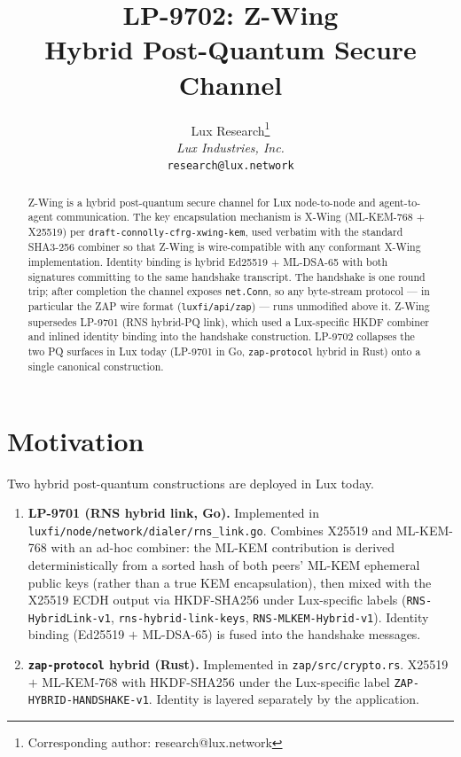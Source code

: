 \documentclass[11pt,a4paper]{article}
\title{LP-9702: Z-Wing\\Hybrid Post-Quantum Secure Channel}
\author{
Lux Research\thanks{Corresponding author: research@lux.network}\\
\textit{Lux Industries, Inc.}\\
\texttt{research@lux.network}
}
\date{}
\begin{document}
\luxcoverpage

\begin{abstract}
Z-Wing is a hybrid post-quantum secure channel for Lux node-to-node and
agent-to-agent communication. The key encapsulation mechanism is X-Wing
(ML-KEM-768 $+$ X25519) per \texttt{draft-connolly-cfrg-xwing-kem}, used
verbatim with the standard SHA3-256 combiner so that Z-Wing is wire-compatible
with any conformant X-Wing implementation. Identity binding is hybrid
Ed25519 $+$ ML-DSA-65 with both signatures committing to the same handshake
transcript. The handshake is one round trip; after completion the channel
exposes \texttt{net.Conn}, so any byte-stream protocol --- in particular the
ZAP wire format (\texttt{luxfi/api/zap}) --- runs unmodified above it.
Z-Wing supersedes LP-9701 (RNS hybrid-PQ link), which used a Lux-specific
HKDF combiner and inlined identity binding into the handshake construction.
LP-9702 collapses the two PQ surfaces in Lux today (LP-9701 in Go,
\texttt{zap-protocol} hybrid in Rust) onto a single canonical construction.
\end{abstract}

\tableofcontents
\newpage

\section{Motivation}

Two hybrid post-quantum constructions are deployed in Lux today.

\begin{enumerate}[leftmargin=*]
  \item \textbf{LP-9701 (RNS hybrid link, Go).} Implemented in
        \texttt{luxfi/node/network/dialer/rns\_link.go}. Combines X25519
        and ML-KEM-768 with an ad-hoc combiner: the ML-KEM contribution
        is derived deterministically from a sorted hash of both peers'
        ML-KEM ephemeral public keys (rather than a true KEM
        encapsulation), then mixed with the X25519 ECDH output via
        HKDF-SHA256 under Lux-specific labels
        (\texttt{RNS-HybridLink-v1}, \texttt{rns-hybrid-link-keys},
        \texttt{RNS-MLKEM-Hybrid-v1}). Identity binding (Ed25519 $+$ ML-DSA-65)
        is fused into the handshake messages.
  \item \textbf{\texttt{zap-protocol} hybrid (Rust).} Implemented in
        \texttt{zap/src/crypto.rs}. X25519 $+$ ML-KEM-768 with HKDF-SHA256
        under the Lux-specific label \texttt{ZAP-HYBRID-HANDSHAKE-v1}.
        Identity is layered separately by the application.
\end{enumerate}
\end{document}

